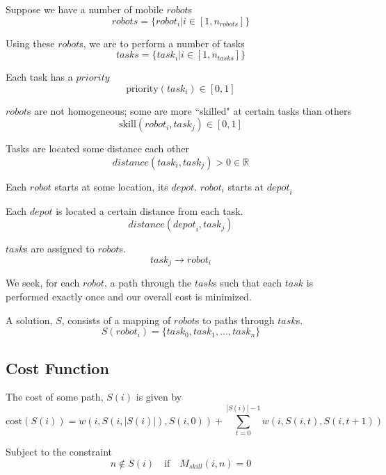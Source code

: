 \documentclass[a4paper]{article}
\begin{document}

Suppose we have a number of mobile $\mathit{robot}$s
$$\mathit{robots} = \{ \mathit{robot}_i | i \in [1, n_\mathit{robots}] \}$$

Using these $\mathit{robot}$s, we are to perform a number of tasks
$$\mathit{tasks} = \{ \mathit{task}_i | i \in [1, n_\mathit{tasks}] \}$$

Each task has a $\mathit{priority}$
$$\text{priority}(\mathit{task}_i) \in [0 ,1]$$

$\mathit{robot}$s are not homogeneous; some are more ``skilled" at certain tasks than others
$$\text{skill}(\mathit{robot}_i, \mathit{task}_j) \in [0 ,1]$$

Tasks are located some distance each other
$$\mathit{distance}(\mathit{task}_i, \mathit{task}_j) > 0 \in \mathbb{R}$$

Each $\mathit{robot}$ starts at some location, its $\mathit{depot}$. $\mathit{robot}_i$ starts at $\mathit{depot}_i$

Each $\textit{depot}$ is located a certain distance from each task.
$$\mathit{distance}(\mathit{depot}_i, \mathit{task}_j)$$

$\mathit{task}$s are assigned to $\mathit{robot}$s.
$$\mathit{task}_j \rightarrow \mathit{robot}_i$$

We seek, for each $\mathit{robot}$, a path through the $\mathit{task}$s such that each $\mathit{task}$ is performed exactly once and our overall cost is minimized.

A solution, $S$, consists of a mapping of $\mathit{robot}$s to paths through $\mathit{task}$s.
$$S(\mathit{robot}_i) = \{\mathit{task}_0, \mathit{task}_1, ..., \mathit{task}_n\}$$



\subsection{Cost Function}



The cost of some path, $S(i)$ is given by
$$
\text{cost}(S(i)) = w(i, S(i,|S(i)|), S(i,0)) + \sum_{t = 0}^{|S(i)|-1} w(i, S(i,t), S(i,t+1))
$$

Subject to the constraint
$$
n \notin S(i) \quad \text{if} \quad M_{skill}(i, n) = 0
$$
\end{document}
